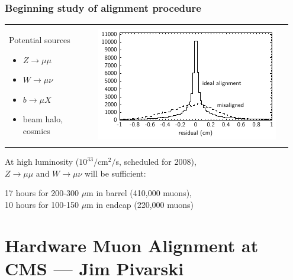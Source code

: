\documentclass[compress]{beamer}
\begin{document}
\begin{frame}
\frametitle{Beginning study of alignment procedure}

\begin{tabular}{p{0.3\linewidth} p{0.65\linewidth}}
  \begin{minipage}{\linewidth}
    \vspace{-0.5 cm}
    Potential sources
    \begin{itemize}
      \item $Z\to\mu\mu$
      \item $W\to\mu\nu$
      \item $b\to\mu X$
      \item beam halo, cosmics
    \end{itemize}
  \end{minipage} &
  \begin{minipage}{\linewidth}
    \includegraphics[width=\linewidth]{plots/mine/alignment_residuals.pdf}
  \end{minipage}
\end{tabular}

\vfill
At high luminosity ($10^{33}/$cm$^2/$s, scheduled for 2008), \\ $Z\to\mu\mu$ and $W\to\mu\nu$ will be sufficient:

\vspace{-0.25 cm}
\begin{center}
  17 hours for 200-300 $\mu$m in barrel (410,000 muons), \\ 10 hours for 100-150 $\mu$m in endcap (220,000 muons)
\end{center}
\end{frame}

\section*{Hardware Muon Alignment at CMS --- Jim Pivarski}
\end{document}
